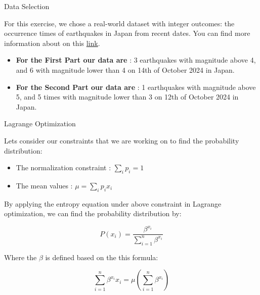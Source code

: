 \begin{frame}{Data Selection}

For this exercise, we chose a real-world dataset with integer outcomes: the occurrence times of earthquakes in Japan from recent dates. You can find more information about on this \href{https://earthquaketrack.com/p/japan/recent}{link}.

\begin{itemize}
    \item \textbf{For the First Part our data are } : 3 earthquakes with magnitude above 4, and 6 with magnitude lower than 4 on 14th of October 2024 in Japan.
    \item \textbf{For the Second Part our data are } : 1 earthquakes with magnitude above 5, and 5 times with magnitude lower than 3 on 12th of October 2024 in Japan. 
\end{itemize}  
\end{frame}
\begin{frame}{Lagrange Optimization}

Lets consider our constraints that we are working on to find the probability distribution: 

\begin{itemize}
    \item The normalization constraint : \(\sum_{i} p_i  = 1 \)
    \item The mean values : \( \mu = \sum_{i} p_i x_i \)
\end{itemize}

By applying the entropy equation under above constraint in Lagrange optimization, we can find the probability distribution by:

\[ P(x_i) = \frac{\beta^{x_i}}{\sum_{i=1}^{n} \beta^{x_i}} \]

Where the \( \beta \) is defined based on the this formula: 

\[ \sum_{i=1}^{n} \beta^{x_i} x_i = \mu (\sum_{i=1}^{n} \beta^{x_i})  \]

\end{frame}

